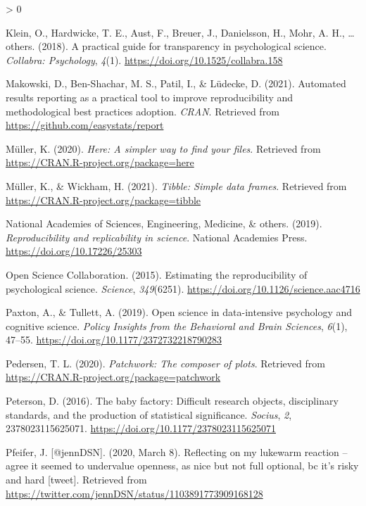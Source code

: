 \documentclass[
  english,
  man,floatsintext]{apa6}
\newlength{\cslhangindent}
\newenvironment{CSLReferences}[2] %
 {%
  \setlength{\parindent}{0pt}
  \ifodd #1 \everypar{\setlength{\hangindent}{\cslhangindent}}\ignorespaces\fi
  \ifnum #2 > 0
  \setlength{\parskip}{#2\baselineskip}
  \fi
 }%
 {}
\begin{document}
\begin{CSLReferences}{1}{0}
\leavevmode\hypertarget{ref-klein2018practical}{}%
Klein, O., Hardwicke, T. E., Aust, F., Breuer, J., Danielsson, H., Mohr, A. H., \ldots{} others. (2018). A practical guide for transparency in psychological science. \emph{Collabra: Psychology}, \emph{4}(1). \url{https://doi.org/10.1525/collabra.158}

\leavevmode\hypertarget{ref-R-report}{}%
Makowski, D., Ben-Shachar, M. S., Patil, I., \& Lüdecke, D. (2021). Automated results reporting as a practical tool to improve reproducibility and methodological best practices adoption. \emph{CRAN}. Retrieved from \url{https://github.com/easystats/report}

\leavevmode\hypertarget{ref-R-here}{}%
Müller, K. (2020). \emph{Here: A simpler way to find your files}. Retrieved from \url{https://CRAN.R-project.org/package=here}

\leavevmode\hypertarget{ref-R-tibble}{}%
Müller, K., \& Wickham, H. (2021). \emph{Tibble: Simple data frames}. Retrieved from \url{https://CRAN.R-project.org/package=tibble}

\leavevmode\hypertarget{ref-national2019reproducibility}{}%
National Academies of Sciences, Engineering, Medicine, \& others. (2019). \emph{Reproducibility and replicability in science}. National Academies Press. \url{https://doi.org/10.17226/25303}

\leavevmode\hypertarget{ref-open2015estimating}{}%
Open Science Collaboration. (2015). Estimating the reproducibility of psychological science. \emph{Science}, \emph{349}(6251). \url{https://doi.org/10.1126/science.aac4716}

\leavevmode\hypertarget{ref-paxton2019open}{}%
Paxton, A., \& Tullett, A. (2019). Open science in data-intensive psychology and cognitive science. \emph{Policy Insights from the Behavioral and Brain Sciences}, \emph{6}(1), 47--55. \url{https://doi.org/10.1177/2372732218790283}

\leavevmode\hypertarget{ref-R-patchwork}{}%
Pedersen, T. L. (2020). \emph{Patchwork: The composer of plots}. Retrieved from \url{https://CRAN.R-project.org/package=patchwork}

\leavevmode\hypertarget{ref-peterson2016baby}{}%
Peterson, D. (2016). The baby factory: Difficult research objects, disciplinary standards, and the production of statistical significance. \emph{Socius}, \emph{2}, 2378023115625071. \url{https://doi.org/10.1177/2378023115625071}

\leavevmode\hypertarget{ref-Pfeifer_tweet}{}%
Pfeifer, J. {[}@jennDSN{]}. (2020, March 8). Reflecting on my lukewarm reaction -- agree it seemed to undervalue openness, as nice but not full optional, bc it's risky and hard {[}tweet{]}. Retrieved from \url{https://twitter.com/jennDSN/status/1103891773909168128}


\end{CSLReferences}
\end{document}
